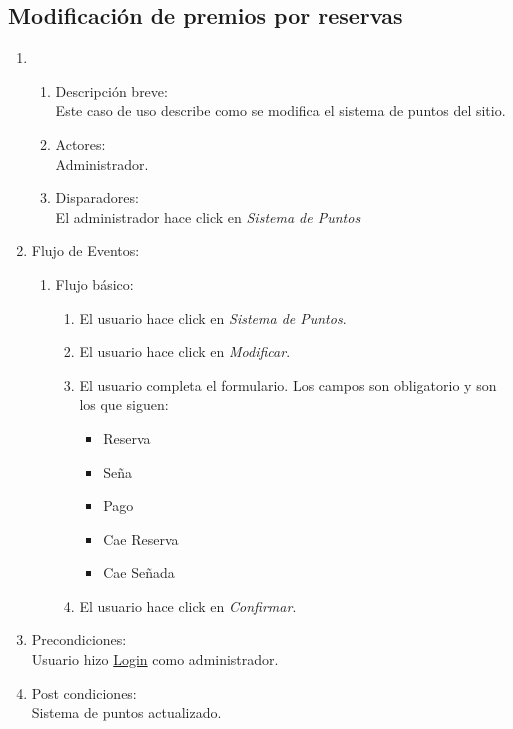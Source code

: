 \documentclass[a4paper,11pt]{article}
\begin{document}
\subsection{Modificaci\'on de premios por reservas}
\begin{enumerate}
    \item
    	\begin{enumerate}
    		\item Descripci\'on breve: \\
        		Este caso de uso describe como se modifica el sistema de puntos del sitio.
    		\item Actores: \\
        		Administrador.
    		\item Disparadores: \\
        		El administrador hace click en \emph{Sistema de Puntos}
    	\end{enumerate}
    \item Flujo de Eventos: 
     	\begin{enumerate}
		\item Flujo b\'asico:
			\begin{enumerate}
				\item El usuario hace click en \emph{Sistema de Puntos}.
				\item El usuario hace click en \emph{Modificar}.
				\item El usuario completa el formulario. Los campos son obligatorio y son los que siguen:
				\begin{itemize}
					\item Reserva
					\item Se\~na
					\item Pago
					\item Cae Reserva
					\item Cae Se\~nada
				\end{itemize}
				\item El usuario hace click en \emph{Confirmar}.
			\end{enumerate}
	\end{enumerate}
    \item Precondiciones: \\
        Usuario hizo \underline{Login} como administrador.
    \item Post condiciones: \\
        Sistema de puntos actualizado.
\end{enumerate}

\end{document}
